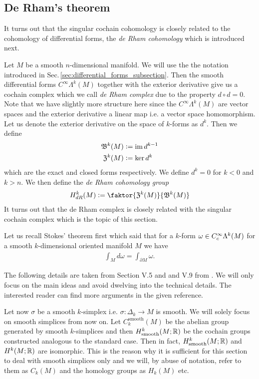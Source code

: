 \documentclass[../main.tex]{subfiles}
\begin{document}
\subsection{De Rham's theorem} \label{sec:de_rhams_theorem}

It turns out that the singular cochain cohomology is closely related to the cohomology 
of differential forms, the \textit{de Rham cohomology} which is introduced next. 

Let $M$ be a smooth $n$-dimensional manifold.
We will use the the notation introduced in 
Sec.\,\ref{sec:differential_forms_subsection}. Then the smooth 
differential forms $C^\infty \Lambda^k (M)$ together 
with the exterior derivative give us a cochain complex which we call 
\textit{de Rham complex} due to the property $d \circ d = 0$. 
Note that we have slightly more structure here
since the $C^\infty \Lambda^k (M)$ are vector spaces and the exterior
derivative a linear map i.e. a vector space homomorphism.
Let us denote the exterior derivative on 
the space of $k$-forms as $d^k$. Then we define
\begin{align*}
    \mathfrak{B}^k(M) &\vcentcolon= \operatorname{im} d^{k-1}
    \\ \mathfrak{Z}^k(M) &\vcentcolon= \ker d^k
\end{align*}
which are the exact and closed forms respectively.
We define $d^k = 0$ for $k < 0$ and $k>n$.
We then define the \textit{de Rham cohomology group} 
\begin{align*}
    H_{dR}^k(M) \vcentcolon= \faktor{\mathfrak{Z}^k(M)}{\mathfrak{B}^k(M)}
\end{align*}
It turns out that the de Rham complex is closely related with the 
singular cochain complex which is the topic of this section.

Let us recall Stokes' theorem first which said 
that for a $k$-form $\omega \in C_c^\infty \Lambda^{k}(M)$ 
for a smooth $k$-dimensional oriented manifold $M$ we have 
\begin{align*}
    \int_M d\omega = \int_{\partial M} \omega.
\end{align*}

The following details are taken from Section V.5 and and V.9 from 
\cite{topology_and_geometry}. We will only focus on the main ideas and avoid 
dwelving into the technical details. The interested reader can find more 
arguments in the given reference.

Let now $\sigma$ be a smooth $k$-simplex i.e. $\sigma: \Delta_k \rightarrow 
M$ is smooth. We will solely focus on smooth simplices from now on. Let 
$C_k^{\text{smooth}}(M)$ be the abelian group generated by smooth $k$-simplices and 
then $H^k_{\text{smooth}}(M;\mathbb{R})$ be the cochain groups constructed analogous to the 
standard case. Then in fact, 
$H^k_{\text{smooth}}(M;\mathbb{R})$ and $H^k(M;\mathbb{R})$ are isomorphic. This 
is the reason why it is sufficient for this section to deal with smooth simplices 
only and we will, by abuse of notation, refer to them as $C_k(M)$
and the homology groups as $H_k(M)$ etc.
\end{document}
